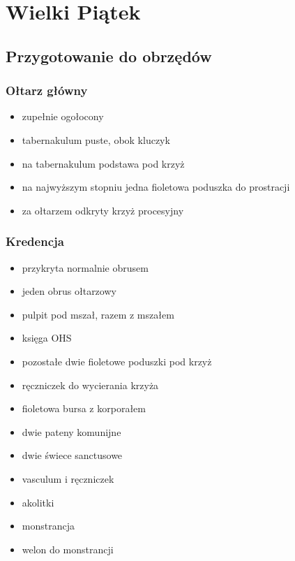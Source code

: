 \chapter{Wielki Piątek}

\section{Przygotowanie do obrzędów}

\subsection{Ołtarz główny}

\begin{itemize}
    \item zupełnie ogołocony
    \item tabernakulum puste, obok kluczyk
    \item na tabernakulum podstawa pod krzyż
    \item na najwyższym stopniu jedna fioletowa poduszka do prostracji
    \item za ołtarzem odkryty krzyż procesyjny
\end{itemize}

\subsection{Kredencja}

\begin{itemize}
    \item przykryta normalnie obrusem
    \item jeden obrus ołtarzowy
    \item pulpit pod mszał, razem z mszałem
    \item księga OHS
    \item pozostałe dwie fioletowe poduszki pod krzyż
    \item ręczniczek do wycierania krzyża
    \item fioletowa bursa z korporałem
    \item dwie pateny komunijne
    \item dwie świece sanctusowe
    \item vasculum i ręczniczek
    \item akolitki
    \item monstrancja
    \item welon do monstrancji
\end{itemize}

